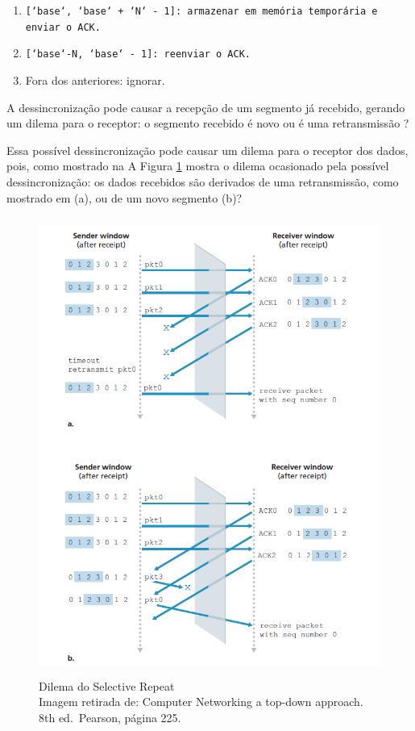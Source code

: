 \begin{enumerate}
\def\labelenumi{\arabic{enumi}.}
\tightlist
\item
    \texttt{[`base`, `base` + `N` - 1]: armazenar em memória temporária e enviar o ACK.}
\item
    \texttt{[`base`-N, `base` - 1]: reenviar o ACK.}
\item
  Fora dos anteriores: ignorar.
\end{enumerate}

A dessincronização pode causar a recepção de um segmento já recebido,
gerando um dilema para o receptor: o segmento recebido é novo ou é uma
retransmissão ?

Essa possível dessincronização pode causar um dilema para o receptor dos
dados, pois, como mostrado na A Figura \ref{Dilema do Selective Repeat} mostra o dilema ocasionado
pela possível dessincronização: os dados recebidos são derivados de uma
retransmissão, como mostrado em (a), ou de um novo segmento (b)?

\begin{figure}[h!]
\centering
\includegraphics[keepaspectratio, width=18cm, height=15cm]{imagens/12/12 - Dilema do Selective Repeat.png}
\caption{Dilema do Selective Repeat \\
Imagem retirada de: Computer Networking a top-down approach. 8th
ed.~Pearson, página 225. \\}
\label{Dilema do Selective Repeat}
\end{figure}


